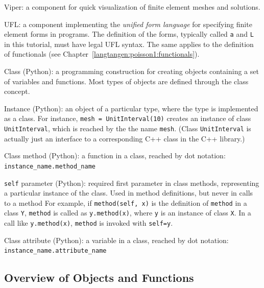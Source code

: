Viper: a \fenics{} component for quick visualization of finite element
meshes and solutions.\gln

UFL: a \fenics{} component implementing the \emph{unified form language}
for specifying finite element forms in \fenics{} programs.
The definition of the forms, typically called {\fontsize{12pt}{12pt}\texttt{a}} and {\fontsize{12pt}{12pt}\texttt{L}} in
this tutorial, must have legal UFL syntax. The same applies to
the definition of functionals (see Chapter~\ref{langtangen:poisson1:functionals}).
\gln

Class (Python): a programming construction for creating objects
containing a set of
variables and functions. Most
types of \fenics{} objects are defined through the class concept.\gln

Instance (Python): an object of a particular type, where the type is
implemented as a class. For instance,
{\fontsize{12pt}{12pt}\texttt{mesh = UnitInterval(10)}} creates
an instance of class {\fontsize{12pt}{12pt}\texttt{UnitInterval}}, which is reached by the
the name {\fontsize{12pt}{12pt}\texttt{mesh}}. (Class {\fontsize{12pt}{12pt}\texttt{UnitInterval}} is actually just
an interface to a corresponding C++ class in the \dolfin{} C++ library.)\gln

Class method (Python): a function in a class, reached by dot notation: {\fontsize{12pt}{12pt}\verb!instance_name.method_name!}\gln

{\fontsize{12pt}{12pt}\texttt{self}} parameter (Python): required first parameter in class methods,
representing a particular instance of the class.
Used in method definitions, but never in calls to a method
For example, if {\fontsize{12pt}{12pt}\texttt{method(self, x)}} is the definition of
{\fontsize{12pt}{12pt}\texttt{method}} in a class {\fontsize{12pt}{12pt}\texttt{Y}}, {\fontsize{12pt}{12pt}\texttt{method}} is called as
{\fontsize{12pt}{12pt}\texttt{y.method(x)}}, where {\fontsize{12pt}{12pt}\texttt{y}} is an instance of class {\fontsize{12pt}{12pt}\texttt{X}}.
In a call like {\fontsize{12pt}{12pt}\texttt{y.method(x)}}, {\fontsize{12pt}{12pt}\texttt{method}} is invoked with
{\fontsize{12pt}{12pt}\texttt{self=y}}.\gln

Class attribute (Python): a variable in a class, reached by dot notation: {\fontsize{12pt}{12pt}\verb!instance_name.attribute_name!}\gln


\subsection{Overview of Objects and Functions}


